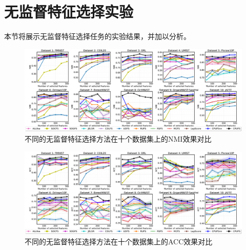 
\section{无监督特征选择实验}
本节将展示无监督特征选择任务的实验结果，并加以分析。
\begin{figure}
    \centering
    \includegraphics[width=\linewidth]{figures/CPUFS/NMIACC/PAMI_NMI.pdf}
    \caption{不同的无监督特征选择方法在十个数据集上的NMI效果对比}
    \label{fig:clusnmi}
\end{figure}

\begin{figure}
    \centering
    \includegraphics[width=\linewidth]{figures/CPUFS/NMIACC/PAMI_ACC.pdf}
    \caption{不同的无监督特征选择方法在十个数据集上的ACC效果对比}
    \label{fig:clusacc}
\end{figure}

